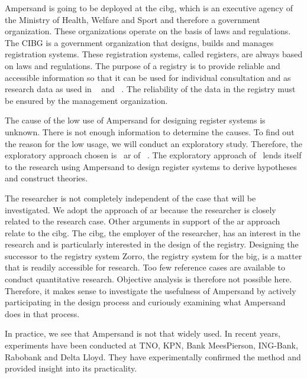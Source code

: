 Ampersand is going to be deployed at the \acrshort{cibg}, which is an executive agency of the Ministry of Health, Welfare and Sport and therefore a government organization.
These organizations operate on the basis of laws and regulations.
The CIBG is a government organization that designs, builds and manages registration systems.
These registration systems, called registers, are always based on laws and regulations.
The purpose of a registry is to provide reliable and accessible information so that it can be used for individual consultation and as research data as used in ~\cite{schmidt_danish_2015} and ~\cite{bakken_norwegian_2019}.
The reliability of the data in the registry must be ensured by the management organization.

The cause of the low use of Ampersand for designing register systems is unknown.
There is not enough information to determine the causes.
To find out the reason for the low usage, we will conduct an exploratory study.
Therefore, the exploratory approach chosen is ~\acrfull{ar} of ~\cite{Easterbrook}.
The exploratory approach of~\cite{Easterbrook} lends itself to the research using Ampersand to design register systems to derive hypotheses and construct theories.

The researcher is not completely independent of the case that will be investigated.
We adopt the approach of  \acrshort{ar} because the researcher is closely related to the research case.
Other arguments in support of the \acrshort{ar} approach relate to the \acrshort{cibg}.
The \acrshort{cibg}, the employer of the researcher, has an interest in the research and is particularly interested in the design of the registry.
Designing the successor to the registry system Zorro, the registry system for the \acrfull{big}, is a matter that is readily accessible for research.
Too few reference cases are available to conduct quantitative research.
Objective analysis is therefore not possible here.
Therefore, it makes sense to investigate the usefulness of Ampersand by actively participating in the design process and curiously examining what Ampersand does in that process.

In practice, we see that Ampersand is not that widely used.
In recent years, experiments have been conducted at TNO, KPN, Bank MeesPierson, ING-Bank, Rabobank and Delta Lloyd.
They have experimentally confirmed the method and provided insight into its practicality.

